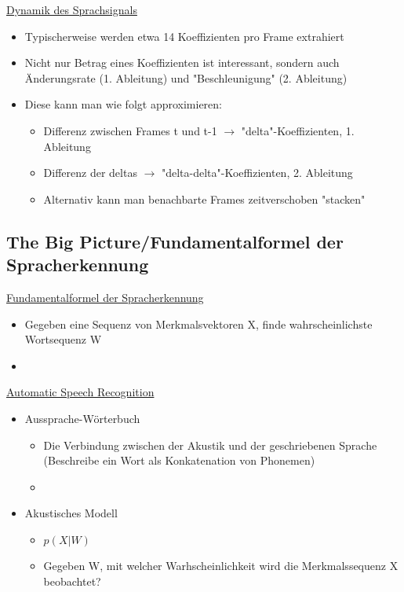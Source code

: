 \documentclass[a4paper,10pt,oneside]{article}
\begin{document}

\underline{Dynamik des Sprachsignals} \\
	\begin{itemize}
		\item Typischerweise werden etwa 14 Koeffizienten pro Frame extrahiert
		\item Nicht nur Betrag eines Koeffizienten ist interessant, sondern auch Änderungsrate (1. Ableitung) und "Beschleunigung" (2. Ableitung)
		\item Diese kann man wie folgt approximieren:
			\begin{itemize}
				\item Differenz zwischen Frames t und t-1 $\rightarrow$ "delta"-Koeffizienten, 1. Ableitung
				\item Differenz der deltas $\rightarrow$ "delta-delta"-Koeffizienten, 2. Ableitung 
				\item Alternativ kann man benachbarte Frames zeitverschoben "stacken"
			\end{itemize}
	\end{itemize}
	
\subsection{The Big Picture/Fundamentalformel der Spracherkennung}

\underline{Fundamentalformel der Spracherkennung} \\
	\begin{itemize}
		\item Gegeben eine Sequenz von Merkmalsvektoren X, finde wahrscheinlichste Wortsequenz W
		\item[] %
	\end{itemize}
	
\underline{Automatic Speech Recognition} \\
	\begin{itemize}
		\item Aussprache-Wörterbuch 
			\begin{itemize}
				\item Die Verbindung zwischen der Akustik und der geschriebenen Sprache (Beschreibe ein Wort als Konkatenation von Phonemen)
				\item[] %
			\end{itemize}
		\item Akustisches Modell
			\begin{itemize}
				\item $p(X|W)$
				\item Gegeben W, mit welcher Warhscheinlichkeit wird die Merkmalssequenz X beobachtet?
			\end{itemize}
	\end{itemize}
\end{document}
